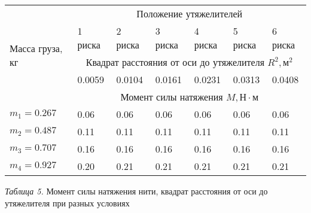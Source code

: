 \begin{center}
    \begin{tabular}{|p{2.5cm}|p{1.5cm}|p{1.5cm}|p{1.5cm}|p{1.5cm}|p{1.5cm}|p{1.5cm}|}
        \hline
        \multirow{5}{2.5cm}{Масса груза, кг} & \multicolumn{6}{c|}{Положение утяжелителей} \\
        \cline{2-7}
        & 1 риска       & 2 риска & 3 риска & 4 риска & 5 риска & 6 риска \\
        \cline{2-7}
        & \multicolumn{6}{c|}{Квадрат расстояния от оси до утяжелителя $R^2, \text{м}^2$} \\
        \cline{2-7}
        &  0.0059  &    0.0104   &   0.0161    &    0.0231   &    0.0313   &    0.0408   \\
        \cline{2-7}
        & \multicolumn{6}{c|}{Момент силы натяжения $M, \text{Н} \cdot \text{м}$} \\
        \hline
        $m_1 = 0.267$ &   0.06    &   0.06    &    0.06   &    0.06   &    0.06   &   0.06    \\
        \hline
        $m_2 = 0.487$ &   0.11    &   0.11    &    0.11   &    0.11   &     0.11   
        &   0.11    \\
        \hline
        $m_3 = 0.707$ &   0.16    &   0.16    &    0.16   &    0.16   &    0.16   &   0.16    \\
        \hline
        $m_4 = 0.927$ &   0.20    &   0.21    &    0.21   &    0.21   &    0.21   &   0.21    \\
        \hline

    \end{tabular}

    \smallvspace

    \textit{Таблица 5.} Момент силы натяжения нити, квадрат расстояния от оси до утяжелителя при разных условиях
\end{center}
